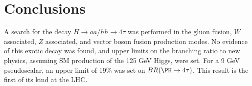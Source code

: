 \chapter{Conclusions\label{sec:conclusions}}

A search for the decay $H\rightarrow$$aa/hh\rightarrow4\tau$ was performed in the gluon fusion, $W$ associated, $Z$ associated, and vector boson fusion production modes.  No evidence of this exotic decay was found, and upper limits on the branching ratio to new physics, assuming SM production of the 125 GeV Higgs, were set.  For a 9 GeV pseudoscalar, an upper limit of 19\% was set on $BR(\PH\to4\tau)$. This result is the first of its kind at the LHC.
